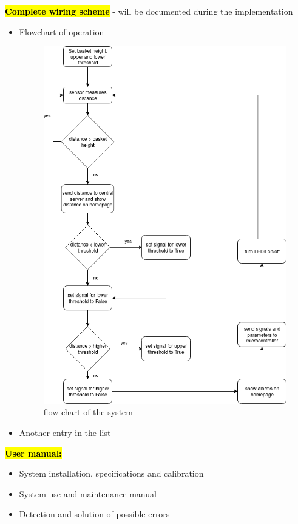 \documentclass{article}
\begin{document}
\textcolor{red}{\textbf{\hl{Complete wiring scheme }}} - will be documented during the implementation 
\begin{itemize}
	 \item Flowchart of operation  
	\begin{figure}[h]
		\center
		\includegraphics[scale=0.6]{flowChart.png}
		\caption{flow chart of the system}
		\label{sensorWithArduino}
	\end{figure}
	\item Another entry in the list
	
\end{itemize}

\textcolor{red}{\textbf{\hl{User manual:}}}
\begin{itemize}
	\item System installation, specifications and calibration
	\item System use and maintenance manual
	\item Detection and solution of possible errors
\end{itemize}
\end{document}
